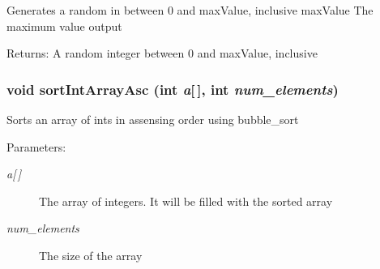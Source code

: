 Generates a random in between 0 and max\-Value, inclusive  max\-Value The maximum value output \begin{Desc}
\item[Returns:]A random integer between 0 and max\-Value, inclusive \end{Desc}
\subsubsection{\setlength{\rightskip}{0pt plus 5cm}void sort\-Int\-Array\-Asc (int {\em a}[$\,$], int {\em num\_\-elements})}\label{sort__arrays_8c_9d9289829617c48dbe1b63e75e806ea8}


Sorts an array of ints in assensing order using bubble\_\-sort \begin{Desc}
\item[Parameters:]
\begin{description}
\item[{\em a\mbox{[}$\,$\mbox{]}}]The array of integers. It will be filled with the sorted array \item[{\em num\_\-elements}]The size of the array \end{description}
\end{Desc}
